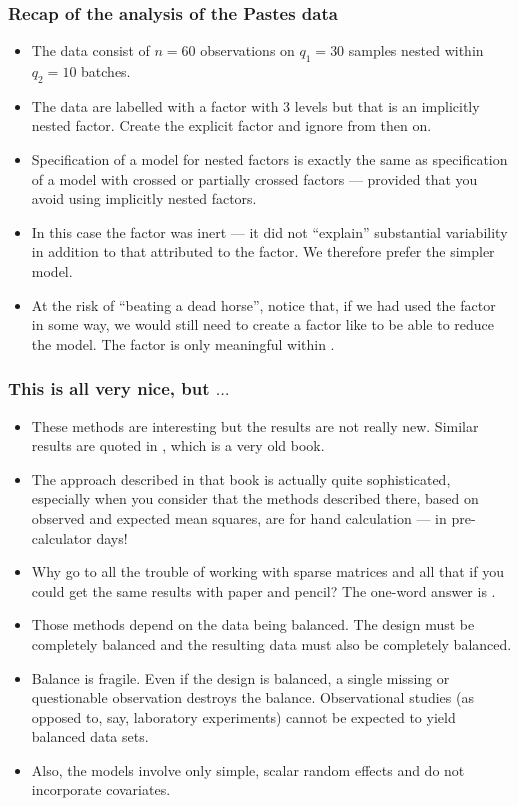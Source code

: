 \begin{frame}
  \frametitle{Recap of the analysis of the Pastes data}
  \begin{itemize}
  \item The data consist of $n=60$ observations on $q_1=30$ samples
    nested within $q_2=10$ batches.  
  \item The data are labelled with a  factor with $3$
    levels but that is an implicitly nested factor.  Create the
    explicit factor  and ignore  from then
    on.
  \item Specification of a model for nested factors is exactly the
    same as specification of a model with crossed or partially crossed
    factors --- provided that you avoid using implicitly nested factors.
  \item In this case the  factor was inert --- it did not
    ``explain'' substantial variability in addition to that attributed
    to the  factor. We therefore prefer the simpler model.
  \item At the risk of ``beating a dead horse'', notice that, if we had
    used the  factor in some way, we would still need to
    create a factor like  to be able to reduce the
    model.  The  factor is only meaningful within .
  \end{itemize}
\end{frame}

\begin{frame}
  \frametitle{This is all very nice, but $\dots$}
  \begin{itemize}
  \item These methods are interesting but the results are not really
    new. Similar results are quoted in , which is a very old book.
  \item The approach described in that book is actually quite
    sophisticated, especially when you consider that the methods
    described there, based on observed and expected mean squares, are
    for hand calculation --- in pre-calculator days!
  \item Why go to all the trouble of working with sparse matrices and
    all that if you could get the same results with paper and pencil?
    The one-word answer is . 
  \item Those methods depend on the data being balanced. The design
    must be completely balanced and the resulting data must also be
    completely balanced.
  \item Balance is fragile.  Even if the design is balanced, a single
    missing or questionable observation destroys the balance.
    Observational studies (as opposed to, say, laboratory experiments)
    cannot be expected to yield balanced data sets.
  \item Also, the models involve only simple, scalar random effects
    and do not incorporate covariates.
  \end{itemize}
\end{frame}

